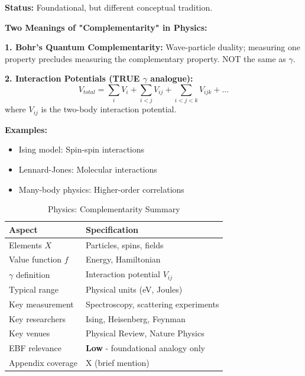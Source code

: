\begin{tcolorbox}[colback=blue!5!white,colframe=blue!75!black,title=\textbf{Physics: Interaction Potentials and Quantum Complementarity}]

\textbf{Status:} Foundational, but different conceptual tradition.

\textbf{Two Meanings of "Complementarity" in Physics:}

\textbf{1. Bohr's Quantum Complementarity:}
Wave-particle duality; measuring one property precludes measuring the complementary property. NOT the same as $\gamma$.

\textbf{2. Interaction Potentials (TRUE $\gamma$ analogue):}
\begin{equation}
V_{total} = \sum_i V_i + \sum_{i<j} V_{ij} + \sum_{i<j<k} V_{ijk} + \ldots
\end{equation}
where $V_{ij}$ is the two-body interaction potential.

\textbf{Examples:}
\begin{itemize}[noitemsep]
    \item Ising model: Spin-spin interactions
    \item Lennard-Jones: Molecular interactions
    \item Many-body physics: Higher-order correlations
\end{itemize}

\end{tcolorbox}

\begin{table}[h]
\centering
\caption{Physics: Complementarity Summary}
\label{tab:physics-summary}
\renewcommand{\arraystretch}{1.3}
\small
\begin{tabular}{@{}ll@{}}
\toprule
\textbf{Aspect} & \textbf{Specification} \\
\midrule
Elements $X$ & Particles, spins, fields \\
Value function $f$ & Energy, Hamiltonian \\
$\gamma$ definition & Interaction potential $V_{ij}$ \\
Typical range & Physical units (eV, Joules) \\
Key measurement & Spectroscopy, scattering experiments \\
Key researchers & Ising, Heisenberg, Feynman \\
Key venues & Physical Review, Nature Physics \\
EBF relevance & \textbf{Low} - foundational analogy only \\
Appendix coverage & X (brief mention) \\
\bottomrule
\end{tabular}
\end{table}

